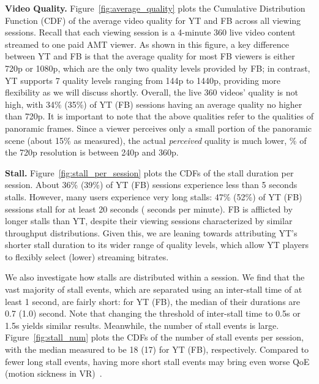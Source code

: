 \BULLET \textbf{Video Quality.}
Figure~\ref{fig:average_quality} plots the Cumulative Distribution Function (CDF) of the average video quality for YT and FB across all viewing sessions. Recall that each viewing session is a 4-minute 360\degree{} live video content streamed to one paid AMT viewer. As shown in this figure, a key difference between YT and FB is that the average quality for most FB viewers is either 720p or 1080p, which are the only two quality levels provided by FB; in contrast, YT supports 7 quality levels ranging from 144p to 1440p, providing more flexibility as we will discuss shortly.
Overall, the live 360\degree{} videos' quality is not high, with 34\% (35\%) of YT (FB) sessions having an average quality no higher than 720p.
%
It is important to note that the above qualities refer to the qualities of panoramic frames. Since a viewer perceives only a small portion of the panoramic scene (about 15\% as measured), the actual \emph{perceived} quality is much lower, \% of the 720p resolution is between 240p and 360p.

\BULLET \textbf{Stall.} Figure~\ref{fig:stall_per_session} plots the CDFs of the stall duration per session. About 36\% (39\%) of YT (FB) sessions experience less than 5 seconds stalls. However, many users experience very long stalls: 47\% (52\%) of YT (FB) sessions stall for at least 20 seconds ( seconds per minute). FB is afflicted by longer stalls than YT, despite their viewing  sessions characterized by similar throughput distributions. Given this, we are leaning towards attributing YT's shorter stall duration to its wider range of quality levels, which allow YT players to flexibly select (lower) streaming bitrates.

We also investigate how stalls are distributed within a session. We find that the vast majority of stall events, which are separated using an inter-stall time of at least 1 second, are fairly short: for YT (FB), the median of their durations are 0.7 (1.0) second.  Note that changing the threshold of inter-stall time to 0.5s or 1.5s yields similar results. 
%
Meanwhile, the number of stall events is large. Figure~\ref{fig:stall_num} plots the CDFs of the number of stall events per session, with the median measured to be 18 (17) for YT (FB), respectively. Compared to fewer long stall events, having more short stall events may bring even worse QoE (\eg motion sickness in VR)~\cite{duanmu2017qoe, moorthy2012qoe, qi06qoe}. %

